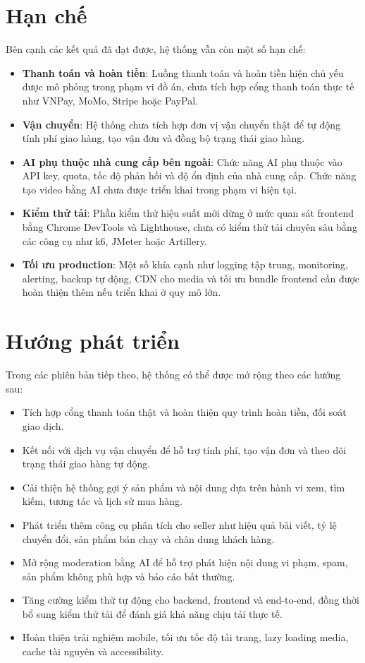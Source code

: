\section{Hạn chế}

Bên cạnh các kết quả đã đạt được, hệ thống vẫn còn một số hạn chế:

\begin{itemize}
    \item \textbf{Thanh toán và hoàn tiền}: Luồng thanh toán và hoàn tiền hiện chủ yếu được mô phỏng trong phạm vi đồ án, chưa tích hợp cổng thanh toán thực tế như VNPay, MoMo, Stripe hoặc PayPal.
    \item \textbf{Vận chuyển}: Hệ thống chưa tích hợp đơn vị vận chuyển thật để tự động tính phí giao hàng, tạo vận đơn và đồng bộ trạng thái giao hàng.
    \item \textbf{AI phụ thuộc nhà cung cấp bên ngoài}: Chức năng AI phụ thuộc vào API key, quota, tốc độ phản hồi và độ ổn định của nhà cung cấp. Chức năng tạo video bằng AI chưa được triển khai trong phạm vi hiện tại.
    \item \textbf{Kiểm thử tải}: Phần kiểm thử hiệu suất mới dừng ở mức quan sát frontend bằng Chrome DevTools và Lighthouse, chưa có kiểm thử tải chuyên sâu bằng các công cụ như k6, JMeter hoặc Artillery.
    \item \textbf{Tối ưu production}: Một số khía cạnh như logging tập trung, monitoring, alerting, backup tự động, CDN cho media và tối ưu bundle frontend cần được hoàn thiện thêm nếu triển khai ở quy mô lớn.
\end{itemize}

\section{Hướng phát triển}

Trong các phiên bản tiếp theo, hệ thống có thể được mở rộng theo các hướng sau:

\begin{itemize}
    \item Tích hợp cổng thanh toán thật và hoàn thiện quy trình hoàn tiền, đối soát giao dịch.
    \item Kết nối với dịch vụ vận chuyển để hỗ trợ tính phí, tạo vận đơn và theo dõi trạng thái giao hàng tự động.
    \item Cải thiện hệ thống gợi ý sản phẩm và nội dung dựa trên hành vi xem, tìm kiếm, tương tác và lịch sử mua hàng.
    \item Phát triển thêm công cụ phân tích cho seller như hiệu quả bài viết, tỷ lệ chuyển đổi, sản phẩm bán chạy và chân dung khách hàng.
    \item Mở rộng moderation bằng AI để hỗ trợ phát hiện nội dung vi phạm, spam, sản phẩm không phù hợp và báo cáo bất thường.
    \item Tăng cường kiểm thử tự động cho backend, frontend và end-to-end, đồng thời bổ sung kiểm thử tải để đánh giá khả năng chịu tải thực tế.
    \item Hoàn thiện trải nghiệm mobile, tối ưu tốc độ tải trang, lazy loading media, cache tài nguyên và accessibility.
\end{itemize}


